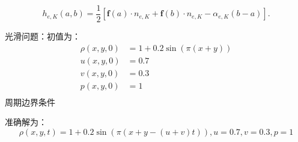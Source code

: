 \documentclass{book}
\begin{document}
\begin{equation}
    h_{e, K}(a, b)=\frac{1}{2}\left[\mathbf{f}(a) \cdot n_{e, K}+\mathbf{f}(b) \cdot n_{e, K}-\alpha_{e, K}(b-a)\right] .
\end{equation}


\begin{example}{}{}
    光滑问题：初值为：
    \begin{equation}
        \begin{aligned}
            \rho(x,y,0) & = 1+0.2\sin(\pi(x+y)) \\
            u(x,y,0)    & = 0.7                 \\
            v(x,y,0)    & = 0.3                 \\
            p(x,y,0)    & = 1                   \\
        \end{aligned}
    \end{equation}
    周期边界条件

    准确解为：
    \begin{equation}
        \rho(x,y,t) = 1+0.2\sin(\pi(x+y-(u+v)t)),u=0.7,v=0.3,p=1
    \end{equation}
\end{example}
\end{document}
